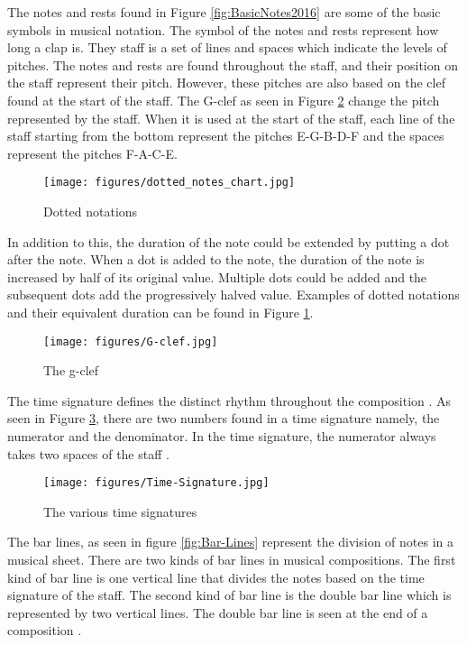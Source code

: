 The notes and rests found in Figure \ref{fig:BasicNotes2016} are some of the basic symbols in musical notation. The symbol of the notes and rests represent how long a clap is. They staff is a set of lines and spaces which indicate the levels of pitches. The notes and rests are found throughout the staff, and their position on the staff represent their pitch. However, these pitches are also based on the clef found at the start of the staff. The G-clef as seen in Figure \ref{fig:G-Clef} change the pitch represented by the staff. When it is used at the start of the staff, each line of the staff starting from the bottom represent the pitches E-G-B-D-F and the spaces represent the pitches F-A-C-E.

\begin{figure}[H]
    \centering
    \texttt{[image: figures/dotted\_notes\_chart.jpg]}
    \caption{Dotted notations \protect\cite{DottedNotes2015}}
    \label{fig:DottedNotes2015}
\end{figure}

In addition to this, the duration of the note could be extended by putting a dot after the note. When a dot is added to the note, the duration of the note is increased by half of its original value. Multiple dots could be added and the subsequent dots add the progressively halved value. Examples of dotted notations and their equivalent duration can be found in Figure \ref{fig:DottedNotes2015}.

\begin{figure}[H]
    \centering
    \texttt{[image: figures/G-clef.jpg]}
    \caption{The g-clef \protect\cite{G-Clef}}
    \label{fig:G-Clef}
\end{figure}

The time signature defines the distinct rhythm throughout the composition \cite{rivadelo1986fundamentals}. As seen in Figure \ref{fig:Time-Signature}, there are two numbers found in a time signature namely, the numerator and the denominator. In the time signature, the numerator always takes two spaces of the staff \cite{read1964music, rivadelo1986fundamentals, burrows1999read}.

\begin{figure}[H]
    \centering
    \texttt{[image: figures/Time-Signature.jpg]}
    \caption{The various time signatures \protect\cite{Time-Signature}}
    \label{fig:Time-Signature}
\end{figure}

The bar lines, as seen in figure \ref{fig:Bar-Lines} represent the division of notes in a musical sheet. There are two kinds of bar lines in musical compositions. The first kind of bar line is one vertical line that divides the notes based on the time signature of the staff. The second kind of bar line is the double bar line which is represented by two vertical lines. The double bar line is seen at the end of a composition \cite{read1964music}.  

